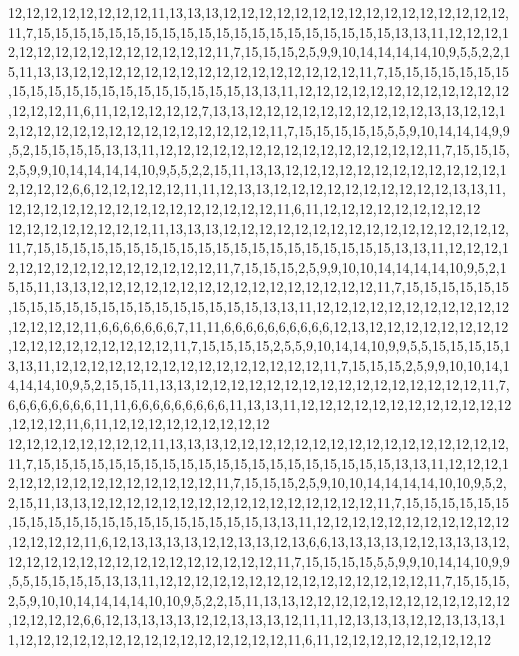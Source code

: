 12,12,12,12,12,12,12,12,11,13,13,13,12,12,12,12,12,12,12,12,12,12,12,12,12,12,12,12,11,7,15,15,15,15,15,15,15,15,15,15,15,15,15,15,15,15,15,15,15,15,13,13,11,12,12,12,12,12,12,12,12,12,12,12,12,12,12,12,11,7,15,15,15,2,5,9,9,10,14,14,14,14,10,9,5,5,2,2,15,11,13,13,12,12,12,12,12,12,12,12,12,12,12,12,12,12,12,12,11,7,15,15,15,15,15,15,15,15,15,15,15,15,15,15,15,15,15,15,15,15,13,13,11,12,12,12,12,12,12,12,12,12,12,12,12,12,12,12,11,6,11,12,12,12,12,12,7,13,13,12,12,12,12,12,12,12,12,12,12,13,13,12,12,12,12,12,12,12,12,12,12,12,12,12,12,12,12,12,11,7,15,15,15,15,15,5,5,9,10,14,14,14,9,9,5,2,15,15,15,15,13,13,11,12,12,12,12,12,12,12,12,12,12,12,12,12,12,12,11,7,15,15,15,2,5,9,9,10,14,14,14,14,10,9,5,5,2,2,15,11,13,13,12,12,12,12,12,12,12,12,12,12,12,12,12,12,12,12,6,6,12,12,12,12,12,11,11,12,13,13,12,12,12,12,12,12,12,12,12,12,13,13,11,12,12,12,12,12,12,12,12,12,12,12,12,12,12,12,11,6,11,12,12,12,12,12,12,12,12,12
12,12,12,12,12,12,12,12,11,13,13,13,12,12,12,12,12,12,12,12,12,12,12,12,12,12,12,12,11,7,15,15,15,15,15,15,15,15,15,15,15,15,15,15,15,15,15,15,15,15,13,13,11,12,12,12,12,12,12,12,12,12,12,12,12,12,12,12,11,7,15,15,15,2,5,9,9,10,10,14,14,14,14,10,9,5,2,15,15,11,13,13,12,12,12,12,12,12,12,12,12,12,12,12,12,12,12,12,11,7,15,15,15,15,15,15,15,15,15,15,15,15,15,15,15,15,15,15,15,15,13,13,11,12,12,12,12,12,12,12,12,12,12,12,12,12,12,12,11,6,6,6,6,6,6,6,7,11,11,6,6,6,6,6,6,6,6,6,6,12,13,12,12,12,12,12,12,12,12,12,12,12,12,12,12,12,12,12,11,7,15,15,15,15,2,5,5,9,10,14,14,10,9,9,5,5,15,15,15,15,13,13,11,12,12,12,12,12,12,12,12,12,12,12,12,12,12,12,11,7,15,15,15,2,5,9,9,10,10,14,14,14,14,10,9,5,2,15,15,11,13,13,12,12,12,12,12,12,12,12,12,12,12,12,12,12,12,12,11,7,6,6,6,6,6,6,6,6,11,11,6,6,6,6,6,6,6,6,6,11,13,13,11,12,12,12,12,12,12,12,12,12,12,12,12,12,12,12,11,6,11,12,12,12,12,12,12,12,12,12
12,12,12,12,12,12,12,12,11,13,13,13,12,12,12,12,12,12,12,12,12,12,12,12,12,12,12,12,11,7,15,15,15,15,15,15,15,15,15,15,15,15,15,15,15,15,15,15,15,15,13,13,11,12,12,12,12,12,12,12,12,12,12,12,12,12,12,12,11,7,15,15,15,2,5,9,10,10,14,14,14,14,10,10,9,5,2,2,15,11,13,13,12,12,12,12,12,12,12,12,12,12,12,12,12,12,12,12,11,7,15,15,15,15,15,15,15,15,15,15,15,15,15,15,15,15,15,15,15,15,13,13,11,12,12,12,12,12,12,12,12,12,12,12,12,12,12,12,11,6,12,13,13,13,13,12,12,13,13,12,13,6,6,13,13,13,13,12,12,13,13,13,12,12,12,12,12,12,12,12,12,12,12,12,12,12,12,12,11,7,15,15,15,15,5,5,9,9,10,14,14,10,9,9,5,5,15,15,15,15,13,13,11,12,12,12,12,12,12,12,12,12,12,12,12,12,12,12,11,7,15,15,15,2,5,9,10,10,14,14,14,14,10,10,9,5,2,2,15,11,13,13,12,12,12,12,12,12,12,12,12,12,12,12,12,12,12,12,6,6,12,13,13,13,13,12,12,13,13,13,12,11,11,12,13,13,13,12,12,13,13,13,11,12,12,12,12,12,12,12,12,12,12,12,12,12,12,12,11,6,11,12,12,12,12,12,12,12,12,12

